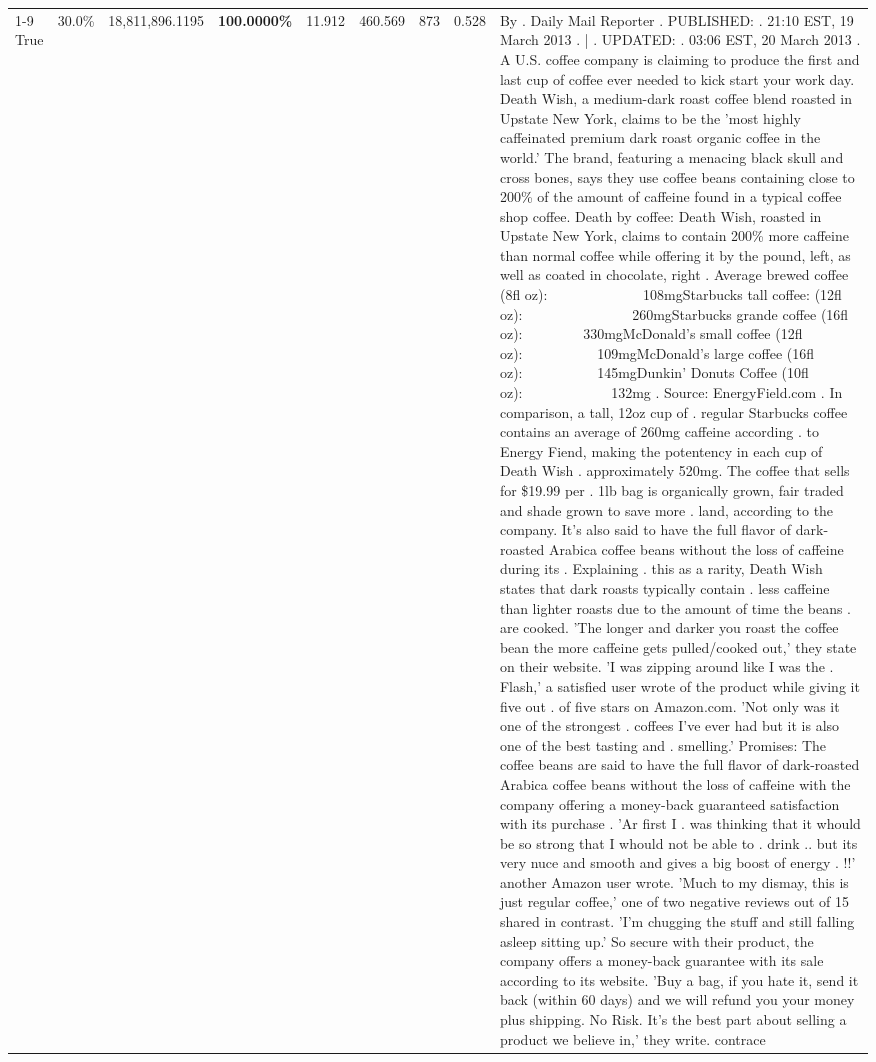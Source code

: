 \begin{table}[H]
{\begin{tabular}{lllrlllll}
\cline{1-9}
True & 30.0\% & 18,811,896.1195 & \bfseries \color{red} 100.0000\% & 11.912 & 460.569 & 873 & 0.528 & By . Daily Mail Reporter . PUBLISHED: . 21:10 EST, 19 March 2013 . | . UPDATED: . 03:06 EST, 20 March 2013 . A U.S. coffee company is claiming to produce the first and last cup of coffee ever needed to kick start your work day. Death Wish, a medium-dark roast coffee blend roasted in Upstate New York, claims to be the 'most highly caffeinated premium dark roast organic coffee in the world.' The brand, featuring a menacing black skull and cross bones, says they use coffee beans containing close to 200\% of the amount of caffeine found in a typical coffee shop coffee. Death by coffee: Death Wish, roasted in Upstate New York, claims to contain 200\% more caffeine than normal coffee while offering it by the pound, left, as well as coated in chocolate, right . Average brewed coffee (8fl oz):              108mgStarbucks tall coffee: (12fl oz):                260mgStarbucks grande coffee (16fl oz):         330mgMcDonald's small coffee (12fl oz):           109mgMcDonald's large coffee (16fl oz):           145mgDunkin' Donuts Coffee (10fl oz):             132mg . Source: EnergyField.com . In comparison, a tall, 12oz cup of . regular Starbucks coffee contains an average of 260mg caffeine according . to Energy Fiend, making the potentency in each cup of Death Wish . approximately 520mg. The coffee that sells for \$19.99 per . 1lb bag is organically grown, fair traded and shade grown to save more . land, according to the company. It's also said to have the full flavor of dark-roasted Arabica coffee beans without the loss of caffeine during its . Explaining . this as a rarity, Death Wish states that dark roasts typically contain . less caffeine than lighter roasts due to the amount of time the beans . are cooked. 'The longer and darker you roast the coffee bean the more caffeine gets pulled/cooked out,' they state on their website. 'I was zipping around like I was the . Flash,' a satisfied user wrote of the product while giving it five out . of five stars on Amazon.com. 'Not only was it one of the strongest . coffees I've ever had but it is also one of the best tasting and . smelling.’ Promises: The coffee beans are said to have the full flavor of dark-roasted Arabica coffee beans without the loss of caffeine with the company offering a money-back guaranteed satisfaction with its purchase . 'Ar first I . was thinking that it whould be so strong that I whould not be able to . drink .. but its very nuce and smooth and gives a big boost of energy . !!' another Amazon user wrote. 'Much to my dismay, this is just regular coffee,' one of two negative reviews out of 15 shared in contrast. 'I'm chugging the stuff and still falling asleep sitting up.' So secure with their product, the company offers a money-back guarantee with its sale according to its website. 'Buy a bag, if you hate it, send it back (within 60 days) and we will refund you your money plus shipping. No Risk. It’s the best part about selling a product we believe in,' they write. contrace \\

\end{tabular}}
\end{table}
